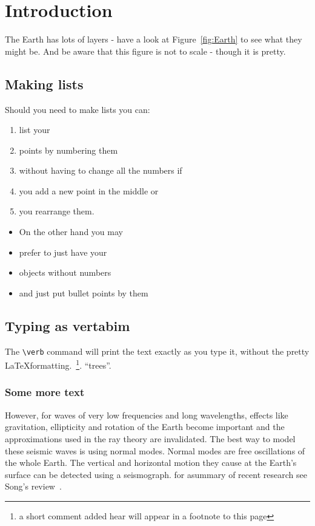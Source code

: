 \documentclass[11pt,a4paper,oneside,titlepage]{article}
\begin{document}
\section{Introduction}

The Earth has lots of layers - have a look at Figure~\ref{fig:Earth} to see what they might be. And be aware that this figure is not to scale - though it is pretty. %




\subsection{Making lists}

Should you need to make lists you can:
\begin{enumerate}
\item list your 
\item points by numbering them
\item without having to change all the numbers if
\item you add a new point in the middle or
\item you rearrange them.
\end{enumerate}

\begin{itemize}
\item On the other hand you may
\item prefer to just have your 
\item objects without numbers
\item and just put bullet points by them
\end{itemize}

\subsection{Typing as vertabim}

The \verb|\verb| command will print the text exactly as you type it, without the pretty \LaTeX formatting.~\footnote{a short comment added hear will appear in a footnote to this page}. ``trees''.

\subsubsection{Some more text}
However, for waves of very low frequencies and long wavelengths, effects like gravitation, ellipticity and rotation of the Earth become important and the approximations used in the ray theory are invalidated. The best way to model these seismic waves is using normal modes. Normal modes are free oscillations of the whole Earth. The vertical and horizontal motion they cause at the Earth's surface can be detected using a seismograph. for asummary of recent research see Song's review~\cite{song97}.  %
\end{document}

